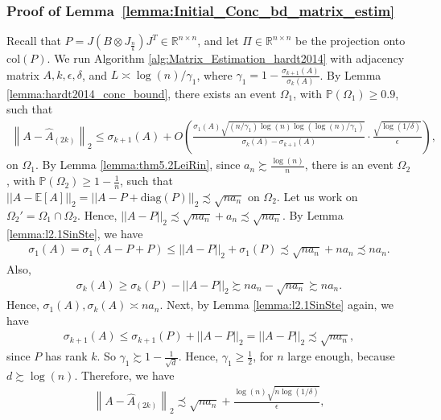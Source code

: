 \documentclass{article}
\begin{document}

\subsubsection{Proof of Lemma~\ref{lemma:Initial_Conc_bd_matrix_estim}}
\label{AppInitConc}

Recall that $P = J(B \otimes J_{\frac{n}{k}})J^T \in \mathbb{R}^{n \times n}$, and let $\Pi \in \mathbb{R}^{n \times n}$ be the projection onto $\text{col}(P)$. We run Algorithm \ref{alg:Matrix_Estimation_hardt2014} with adjacency matrix $A, k, \epsilon, \delta$, and $L \asymp \log(n)/\gamma_1$, where $\gamma_1 = 1 - \frac{\sigma_{k + 1}(A)}{\sigma_k(A)}$. By Lemma \ref{lemma:hardt2014_conc_bound}, there exists an event $\Omega_1$, with $\mathbb{P}(\Omega_1) \geq 0.9$, such that  
\begin{align*}
\left\|A - \hat{A}_{(2k)}\right\|_2 \leq \sigma_{k + 1}(A) + O\left(\frac{\sigma_1(A)\sqrt{(n/\gamma_1)\log(n)\log(\log(n)/\gamma_1)}}{\sigma_k(A) - \sigma_{k + 1}(A)}\cdot \frac{\sqrt{\log(1/\delta)}}{\epsilon}\right),
\end{align*}
on $\Omega_1$. By Lemma \ref{lemma:thm5.2LeiRin}, since $a_n \succsim \frac{\log(n)}{n}$, there is an event $\Omega_2$, with $\mathbb{P}(\Omega_2) \geq 1 - \frac{1}{n}$, such that $||A - \mathbb{E}[A]||_2 = ||A - P + \text{diag}(P)||_2 \precsim \sqrt{na_n}$ on $\Omega_2$. Let us work on $\Omega_2' = \Omega_1 \cap \Omega_2$. Hence, $||A - P||_2 \precsim \sqrt{na_n} + a_n \precsim \sqrt{na_n}$. By Lemma \ref{lemma:l2.1SinSte}, we have
\begin{align*}
\sigma_1(A) = \sigma_1(A - P + P) \leq ||A - P||_2 + \sigma_1(P) \precsim \sqrt{na_n} + na_n \precsim na_n.    
\end{align*}
Also, 
\begin{align*}
\sigma_k(A) \geq \sigma_k(P) - ||A - P||_2 \succsim na_n - \sqrt{na_n} \succsim na_n.
\end{align*}
Hence, $\sigma_1(A), \sigma_k(A) \asymp na_n$. Next, by Lemma \ref{lemma:l2.1SinSte} again, we have
\begin{align*}
\sigma_{k + 1}(A) \leq \sigma_{k + 1}(P) + ||A - P||_2  = ||A - P||_2 \precsim \sqrt{na_n},
\end{align*}
since $P$ has rank $k$. So $\gamma_1 \succsim 1 - \frac{1}{\sqrt{d}}$. Hence, $\gamma_1 \geq \frac{1}{2}$, for $n$ large enough, because $d \succsim \log(n)$. Therefore, we have
\begin{align*}
    \left\|A - \hat{A}_{(2k)}\right\|_2 \precsim \sqrt{na_n} + \frac{\log(n)\sqrt{n\log(1/\delta)}}{\epsilon},
\end{align*}
\end{document}
